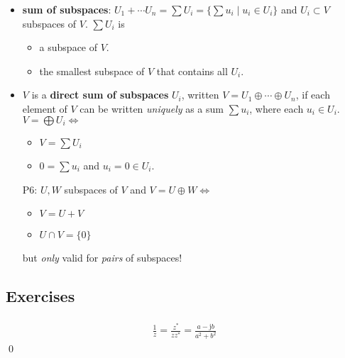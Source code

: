 \documentclass[11pt,notitlepage,oneside]{article}
\newcommand{\exo}[1]{%
\addtocontents{toc}{\protect\setcounter{tocdepth}{2}}%
\paragraph{#1}}
\begin{document}
\begin{itemize}
\item \textbf{sum of subspaces}: $U_1+\cdots U_n = \sum U_i =\{\sum u_i\mid u_i\in U_i\}$ and $U_i\subset V$ subspaces of $V$. $\sum U_i$ is
\begin{itemize}
\item a subspace of $V$.
\item the smallest subspace of $V$ that contains all $U_i$.
\end{itemize}

\item $V$ is a \textbf{direct sum of subspaces} $U_i$, written $V=U_1\oplus\cdots\oplus U_n$, if each element of $V$ can be written \emph{uniquely} as a sum $\sum u_i$, where each $u_i\in U_i$. $V=\bigoplus U_i \iff$
\begin{itemize}
\item $V = \sum U_i$
\item $0=\sum u_i$ and $u_i=0 \in U_i$.
\end{itemize}

\item[P6:] $U,W$ subspaces of $V$ and $V=U\oplus W \iff$
\begin{itemize}
\item $V=U+V$
\item $U\cap V=\{0\}$
\end{itemize}
but \emph{only} valid for \emph{pairs} of subspaces!

\end{itemize}

\subsection*{Exercises}
\exo{}
\begin{align*}
\frac{1}{z} = \frac{z^*}{zz^*}=\frac{a-\mathrm{j}b}{a^2 + b^2}
\end{align*}\qed
\end{document}
